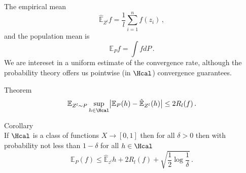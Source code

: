 \documentclass[a4paper]{article}
\newcommand{\ex}{\mathbb{E}}
\begin{document}
The empirical mean
\[ \hat{\ex}_{Z^l} f = \frac{1}{l} \sum_{i=1}^n f(z_i) \,, \]
and the population mean is
\[ \ex_P f = \int f dP \,. \]
We are intereset in a uniform estimate of the convergence rate, although the
probability theory offers us pointwise (in $\Hcal$) convergence guarantees.

\noindent Theorem \hfill\\
\[ \ex_{Z^l\sim P} \sup_{h\in \Hcal} \bigl| \ex_P(h) - \hat{\ex}_{Z^l}(h) \bigr| \leq 2 R_l(f) \,.\]

\noindent Corollary \hfill\\
If $\Hcal$ is a class of functions $X\to[0,1]$ then for all $\delta>0$ then with
probability not less than $1-\delta$ for all $h\in \Hcal$
\[  \ex_P(f) \leq \hat{\ex}_{z^l} h + 2 R_l(f) + \sqrt{ \frac{1}{2}\log \frac{1}{\delta}} \,. \]


\end{document}
